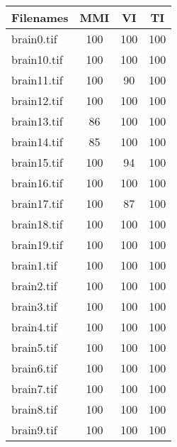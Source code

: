 \begin{tabular}{lccc}
\hline
 Filenames             & MMI & VI  & TI  \\ \hline \hline
 brain0.tif  & 100 & 100 & 100 \\
 brain10.tif & 100 & 100 & 100 \\
 brain11.tif & 100 & 90  & 100 \\
 brain12.tif & 100 & 100 & 100 \\
 brain13.tif & 86  & 100 & 100 \\
 brain14.tif & 85  & 100 & 100 \\
 brain15.tif & 100 & 94  & 100 \\
 brain16.tif & 100 & 100 & 100 \\
 brain17.tif & 100 & 87  & 100 \\
 brain18.tif & 100 & 100 & 100 \\
 brain19.tif & 100 & 100 & 100 \\
 brain1.tif  & 100 & 100 & 100 \\
 brain2.tif  & 100 & 100 & 100 \\
 brain3.tif  & 100 & 100 & 100 \\
 brain4.tif  & 100 & 100 & 100 \\
 brain5.tif  & 100 & 100 & 100 \\
 brain6.tif  & 100 & 100 & 100 \\
 brain7.tif  & 100 & 100 & 100 \\
 brain8.tif  & 100 & 100 & 100 \\
 brain9.tif  & 100 & 100 & 100 \\
\hline
\end{tabular}